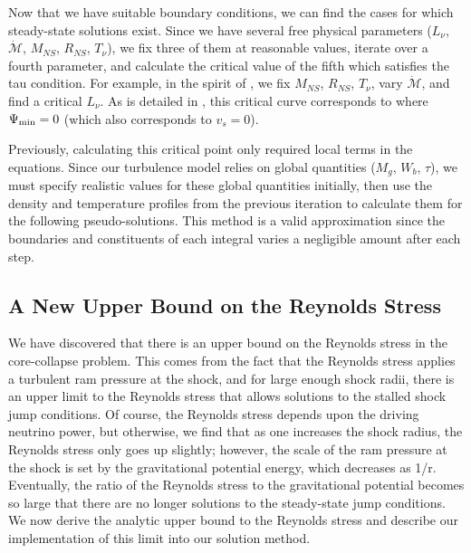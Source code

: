 \documentclass[twocolumn]{aastex6}
\begin{document}
Now that we have suitable boundary conditions, we can find the cases
for which steady-state solutions exist. Since we have several free
physical parameters ($L_\nu$, $\dot{\mathcal{M}}$, $M_{NS}$, $R_{NS}$, $T_\nu$), we fix three of them at reasonable values, iterate over a fourth parameter, and calculate
the critical value of the fifth which satisfies the tau condition. For example, in the spirit of \citet{burrows93}, we fix $M_{NS}$, $R_{NS}$, $T_\nu$, vary $\dot{\mathcal{M}}$, and find a critical $L_\nu$. As is detailed in \citet{murphy17}, this critical curve
  corresponds to where $\Psi_{\rm min} = 0$ (which also corresponds to
  $v_s = 0$). 
  
  Previously, calculating this critical point only required local terms in the equations. Since our turbulence model relies on global quantities ($M_g$, $W_b$, $\tau$), we must specify realistic values for these global quantities initially, then use the density and temperature profiles from the previous iteration to calculate them for the following pseudo-solutions. This method is a valid approximation since the boundaries and constituents of each integral varies a negligible amount after each step.


\subsection{A New Upper Bound on the Reynolds Stress}
\label{Rcap}
We have discovered that there is an upper bound on the Reynolds stress
in the core-collapse problem. This comes from the fact that the
Reynolds stress applies a turbulent ram pressure at the shock, and for
large enough shock radii, there is an upper limit to the Reynolds
stress that allows solutions to the stalled shock jump conditions. Of course, the Reynolds stress depends upon the driving neutrino power,
but otherwise, we find that as one increases the shock
radius, the Reynolds stress only goes up slightly; however, the scale
of the ram pressure at the shock is set by the
gravitational potential energy, which decreases as 1/r. Eventually,
the ratio of the Reynolds stress to the gravitational potential
becomes so large that there are no longer solutions to the steady-state jump conditions. We now derive the analytic upper bound to the Reynolds stress and describe our implementation of this limit into our solution method.
\end{document}
